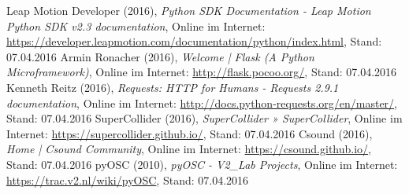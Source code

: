 \documentclass[a4paper, fontsize=12pt, toc=bibliographynumbered]{scrreprt}
\begin{document}
\begin{thebibliography}{9}
Leap Motion Developer (2016),
  \emph{Python SDK Documentation - Leap Motion Python SDK v2.3
    documentation}, Online im Internet:
  \url{https://developer.leapmotion.com/documentation/python/index.html},
  Stand: 07.04.2016
Armin Ronacher (2016), \emph{Welcome | Flask (A Python
    Microframework)}, Online im Internet:
  \url{http://flask.pocoo.org/}, Stand: 07.04.2016
Kenneth Reitz (2016), \emph{Requests: HTTP for
    Humans - Requests 2.9.1 documentation}, Online im Internet:
  \url{http://docs.python-requests.org/en/master/}, Stand: 07.04.2016
SuperCollider (2016), \emph{SuperCollider »
    SuperCollider}, Online im Internet:
  \url{https://supercollider.github.io/}, Stand: 07.04.2016
Csound (2016), \emph{Home | Csound Community}, Online
  im Internet: \url{https://csound.github.io/}, Stand: 07.04.2016
pyOSC (2010), \emph{pyOSC - V2\_Lab Projects}, Online im
  Internet: \url{https://trac.v2.nl/wiki/pyOSC}, Stand: 07.04.2016

\end{thebibliography}
\end{document}
